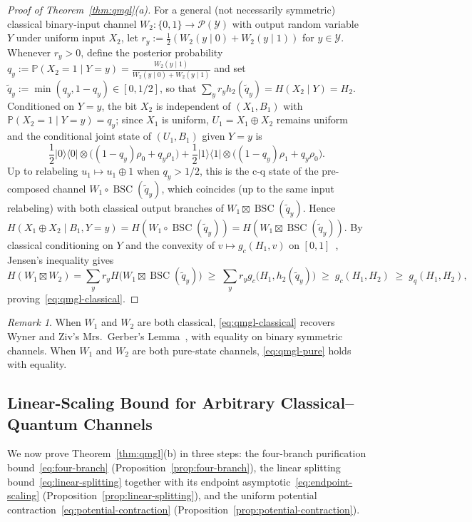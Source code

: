 \documentclass[10pt,a4paper]{article}
\numberwithin{equation}{section}
\theoremstyle{plain}
\theoremstyle{definition}
\theoremstyle{remark}
\newtheorem*{remark}{Remark}
\DeclareMathOperator{\BSC}{BSC}
\newcommand{\cP}{\mathcal{P}}
\newcommand{\cY}{\mathcal{Y}}
\newcommand{\bP}{\mathbb{P}}
\newcommand{\ketbra}[1]{\lvert #1 \rangle\langle #1 \rvert}
\begin{document}
\begin{proof}[Proof of Theorem~\ref{thm:qmgl}(a)]
For a general (not necessarily symmetric) classical binary-input channel $W_2 : \{0,1\} \to \cP(\cY)$ with output random variable $Y$ under uniform input $X_2$, let $r_y := \frac{1}{2}(W_2(y \mid 0) + W_2(y \mid 1))$ for $y \in \cY$. Whenever $r_y > 0$, define the posterior probability $q_y := \bP(X_2 = 1 \mid Y = y) = \frac{W_2(y \mid 1)}{W_2(y \mid 0) + W_2(y \mid 1)}$ and set $\tilde{q}_y := \min(q_y, 1 - q_y) \in [0, 1/2]$, so that $\sum_y r_y h_2(\tilde{q}_y) = H(X_2 \mid Y) = H_2$. Conditioned on $Y = y$, the bit $X_2$ is independent of $(X_1, B_1)$ with $\bP(X_2 = 1 \mid Y = y) = q_y$; since $X_1$ is uniform, $U_1 = X_1 \oplus X_2$ remains uniform and the conditional joint state of $(U_1, B_1)$ given $Y = y$ is
\[
\frac{1}{2}\ketbra{0} \otimes \bigl((1 - q_y)\rho_0 + q_y \rho_1\bigr) + \frac{1}{2}\ketbra{1} \otimes \bigl((1 - q_y)\rho_1 + q_y \rho_0\bigr).
\]
Up to relabeling $u_1 \mapsto u_1 \oplus 1$ when $q_y > 1/2$, this is the c-q state of the pre-composed channel $W_1 \circ \BSC(\tilde{q}_y)$, which coincides (up to the same input relabeling) with both classical output branches of $W_1 \boxtimes \BSC(\tilde{q}_y)$. Hence $H(X_1 \oplus X_2 \mid B_1, Y = y) = H(W_1 \circ \BSC(\tilde{q}_y)) = H(W_1 \boxtimes \BSC(\tilde{q}_y))$. By classical conditioning on $Y$ and the convexity of $v \mapsto g_c(H_1, v)$ on $[0,1]$~\cite{WynerZiv1973}, Jensen's inequality gives
\[
H(W_1 \boxtimes W_2) = \sum_y r_y H\bigl(W_1 \boxtimes \BSC(\tilde{q}_y)\bigr) \;\ge\; \sum_y r_y g_c\bigl(H_1, h_2(\tilde{q}_y)\bigr) \;\ge\; g_c(H_1, H_2) \;\ge\; g_q(H_1, H_2),
\]
proving~\eqref{eq:qmgl-classical}.
\end{proof}

\begin{remark}
When $W_1$ and $W_2$ are both classical, \eqref{eq:qmgl-classical} recovers Wyner and Ziv's Mrs.\ Gerber's Lemma~\cite{WynerZiv1973}, with equality on binary symmetric channels. When $W_1$ and $W_2$ are both pure-state channels, \eqref{eq:qmgl-pure} holds with equality.
\end{remark}

\subsection{Linear-Scaling Bound for Arbitrary Classical--Quantum Channels}

We now prove Theorem~\ref{thm:qmgl}(b) in three steps: the four-branch purification bound~\eqref{eq:four-branch} (Proposition~\ref{prop:four-branch}), the linear splitting bound~\eqref{eq:linear-splitting} together with its endpoint asymptotic~\eqref{eq:endpoint-scaling} (Proposition~\ref{prop:linear-splitting}), and the uniform potential contraction~\eqref{eq:potential-contraction} (Proposition~\ref{prop:potential-contraction}).
\end{document}

